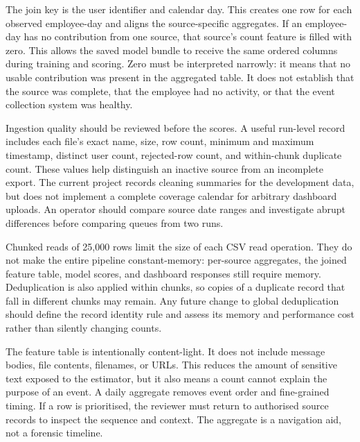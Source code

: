 The join key is the user identifier and calendar day. This creates one
row for each observed employee-day and aligns the source-specific
aggregates. If an employee-day has no contribution from one source,
that source's count feature is filled with zero. This allows the saved
model bundle to receive the same ordered columns during training and
scoring. Zero must be interpreted narrowly: it means that no usable
contribution was present in the aggregated table. It does not establish
that the source was complete, that the employee had no activity, or
that the event collection system was healthy.

Ingestion quality should be reviewed before the scores. A useful
run-level record includes each file's exact name, size, row count,
minimum and maximum timestamp, distinct user count, rejected-row count,
and within-chunk duplicate count. These values help distinguish an
inactive source from an incomplete export. The current project records
cleaning summaries for the development data, but does not implement a
complete coverage calendar for arbitrary dashboard uploads. An operator
should compare source date ranges and investigate abrupt differences
before comparing queues from two runs.

Chunked reads of 25,000 rows limit the size of each CSV read operation.
They do not make the entire pipeline constant-memory: per-source
aggregates, the joined feature table, model scores, and dashboard
responses still require memory. Deduplication is also applied within
chunks, so copies of a duplicate record that fall in different chunks
may remain. Any future change to global deduplication should define the
record identity rule and assess its memory and performance cost rather
than silently changing counts.

The feature table is intentionally content-light. It does not include
message bodies, file contents, filenames, or URLs. This reduces the
amount of sensitive text exposed to the estimator, but it also means a
count cannot explain the purpose of an event. A daily aggregate removes
event order and fine-grained timing. If a row is prioritised, the
reviewer must return to authorised source records to inspect the
sequence and context. The aggregate is a navigation aid, not a
forensic timeline.

